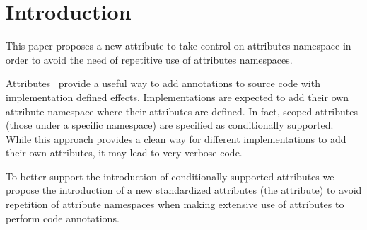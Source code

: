 \section{Introduction}

This paper proposes a new attribute to take control on attributes namespace
in order to avoid the need of repetitive use of attributes namespaces.

Attributes~\cite{n2761} provide a useful way to add annotations to source code with
implementation defined effects. Implementations are expected to add their
own attribute namespace where their attributes are defined. In fact,
scoped attributes (those under a specific namespace) are specified
as conditionally supported. While this approach
provides a clean way for different implementations to add their own attributes,
it may lead to very verbose code.

To better support the introduction of conditionally supported attributes we
propose the introduction of a new standardized attributes (the  attribute)
to avoid repetition of attribute namespaces when making extensive use
of attributes to perform code annotations.
